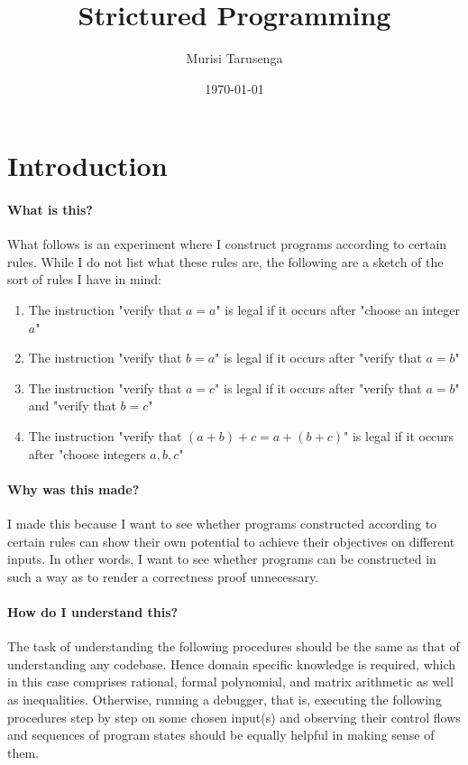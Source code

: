 \documentclass[twocolumn]{article}
\begin{document}
	\title{Strictured Programming}
	\author{Murisi Tarusenga}
	\date{\today{} \currenttime}
	\maketitle
	\section{Introduction}
		\paragraph{What is this?}
			What follows is an experiment where I construct programs according to certain rules. While I do not list what these rules are, the following are a sketch of the sort of rules I have in mind:
			\begin{enumerate}
				\item The instruction "verify that $a=a$" is legal if it occurs after "choose an integer $a$"
				\item The instruction "verify that $b=a$" is legal if it occurs after "verify that $a=b$"
				\item The instruction "verify that $a=c$" is legal if it occurs after "verify that $a=b$" and "verify that $b=c$"
				\item The instruction "verify that $(a+b)+c=a+(b+c)$" is legal if it occurs after "choose integers $a,b,c$"
			\end{enumerate}
		\paragraph{Why was this made?}
			I made this because I want to see whether programs constructed according to certain rules can show their own potential to achieve their objectives on different inputs. In other words, I want to see whether programs can be constructed in such a way as to render a correctness proof unnecessary.
		\paragraph{How do I understand this?}
			The task of understanding the following procedures should be the same as that of understanding any codebase. Hence domain specific knowledge is required, which in this case comprises rational, formal polynomial, and matrix arithmetic as well as inequalities. Otherwise, running a debugger, that is, executing the following procedures step by step on some chosen input(s) and observing their control flows and sequences of program states should be equally helpful in making sense of them.
	\tableofcontents
\end{document}
